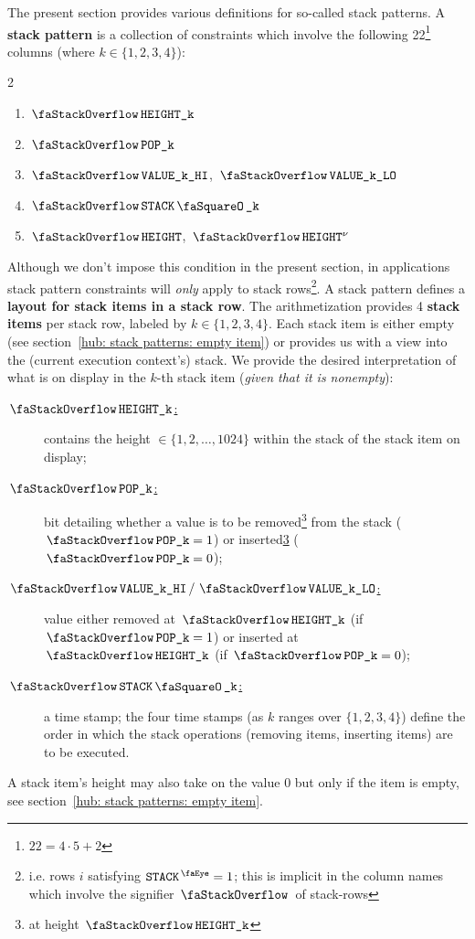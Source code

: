 The present section provides various definitions for so-called stack patterns. A \textbf{stack pattern}\label{def: stack pattern} is a collection of constraints which involve the following 22\footnote{$22 = 4 \cdot 5 + 2$} columns (where $k \in \{1, 2, 3, 4 \}$):
\begin{multicols}{2}
\begin{enumerate}
	\item $\stackItemHeight{k}$
	\item $\stackItemPop{k}$
	\item $\stackItemValHi{k}$, $\stackItemValLo{k}$
	\item $\stackItemStamp{k}$
	\item $\stackHeight$, $\stackHeight\new$
\end{enumerate}
\end{multicols}
\noindent Although we don't impose this condition in the present section, in applications stack pattern constraints will \emph{only} apply to stack rows\footnote{i.e. rows $i$ satisfying $\peekStack = 1$; this is implicit in the column names which involve the signifier $\stackSignifier$ of stack-rows}. A stack pattern defines a \textbf{layout for stack items in a stack row}. The \zkEvm{} arithmetization provides 4 \textbf{stack items}\label{def: stack item} per stack row, labeled by $k \in \{1, 2, 3, 4 \}$. Each stack item is either empty (see section~\ref{hub: stack patterns: empty item}) or provides us with a view into the (current execution context's) stack. We provide the desired interpretation of what is on display in the $k$-th stack item (\emph{given that it is nonempty}):
\begin{description}
	\item[\underline{$\stackItemHeight{k}$:}] contains the height $\in \{1, 2, \dots, 1024 \}$ within the stack of the stack item on display;
	\item[\underline{$\stackItemPop{k}$:}] bit detailing whether a value is to be removed\footnote{\label{footnote: pop at height bla}at height $\stackItemHeight{k}$} from the stack ($\stackItemPop{k} = 1$) or inserted\cref{footnote: pop at height bla} ($\stackItemPop{k} = 0$);
	\item[\underline{$\stackItemValHi{k} \, / \, \stackItemValLo{k}$:}] value either removed at $\stackItemHeight{k}$ (if $\stackItemPop{k} = 1$) or inserted at $\stackItemHeight{k}$ (if $\stackItemPop{k} = 0$);
	\item[\underline{$\stackItemStamp{k}$:}] a time stamp; the four time stamps (as $k$ ranges over $\{1, 2, 3, 4 \}$) define the order in which the stack operations (removing items, inserting items) are to be executed.
\end{description}
\saNote{} A stack item's height may also take on the value $0$ but only if the item is empty, see section~\ref{hub: stack patterns: empty item}.

